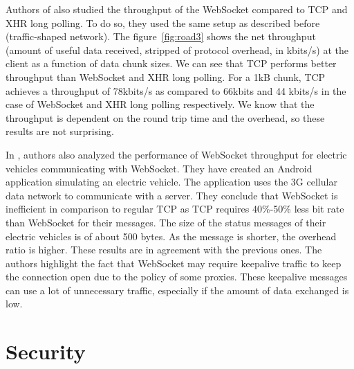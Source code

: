 \documentclass[10pt,journal,compsoc]{IEEEtran}
\newcommand{\ws}{WebSocket}
\begin{document}
Authors of \cite{roadblock} also studied the throughput of the \ws{} compared to TCP and XHR long polling.
To do so, they used the same setup as described before (traffic-shaped network).
The figure~\ref{fig:road3} shows the net throughput (amount of useful data received, stripped of protocol overhead, in kbits/s) at the client as a function of data chunk sizes.
We can see that TCP performs better throughput than \ws{} and XHR long polling.
For a 1kB chunk, TCP achieves a throughput of 78kbits/s as compared to 66kbits and 44 kbits/s in the case of \ws{} and XHR long polling respectively.
We know that the throughput is dependent on the round trip time and the overhead, so these results are not surprising.

In \cite{EV}, authors also analyzed the performance of \ws{} throughput for electric vehicles communicating with \ws{}.
They have created an Android application simulating an electric vehicle.
The application uses the 3G cellular data network to communicate with a server.
They conclude that \ws{} is inefficient in comparison to regular TCP as TCP requires 40\%-50\% less bit rate than \ws{} for their messages.
The size of the status messages of their electric vehicles is of about 500 bytes.
As the message is shorter, the overhead ratio is higher.
These results are in agreement with the previous ones.
The authors highlight the fact that \ws{} may require keepalive traffic to keep the connection open due to the policy of some proxies. %
These keepalive messages can use a lot of unnecessary traffic, especially if the  amount of data exchanged is low. %


\section{Security}
\end{document}

